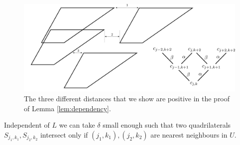 \begin{figure}[!h]
  \includegraphics[width=\linewidth]{images/construction_intersections}
  \caption{The three different distances that we show are positive in the proof of Lemma \ref{lem:dependency}. }
  \label{fig:construction_intersections}
\end{figure}
\begin{lemma}\label{lem:dependency}
Independent of $L$ we can take $\delta$ small enough such that two quadrilaterals $S_{j_1,k_1}, S_{j_2, k_2}$ intersect only if $(j_1, k_1), (j_2, k_2)$ are nearest neighbours in $U$. 
\end{lemma}

